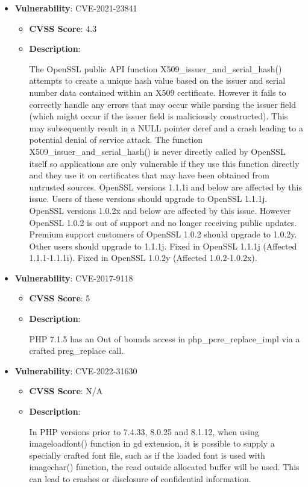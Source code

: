 \documentclass{article}
\begin{document}
\begin{itemize}
        \item \textbf{Vulnerability}: CVE-2021-23841
        \begin{itemize}
            \item \textbf{CVSS Score}:  4.3 
            \item \textbf{Description}:
            \parbox[t]{0.9\linewidth}{
                \ttfamily The OpenSSL public API function X509\_issuer\_and\_serial\_hash() attempts to create a unique hash value based on the issuer and serial number data contained within an X509 certificate. However it fails to correctly handle any errors that may occur while parsing the issuer field (which might occur if the issuer field is maliciously constructed). This may subsequently result in a NULL pointer deref and a crash leading to a potential denial of service attack. The function X509\_issuer\_and\_serial\_hash() is never directly called by OpenSSL itself so applications are only vulnerable if they use this function directly and they use it on certificates that may have been obtained from untrusted sources. OpenSSL versions 1.1.1i and below are affected by this issue. Users of these versions should upgrade to OpenSSL 1.1.1j. OpenSSL versions 1.0.2x and below are affected by this issue. However OpenSSL 1.0.2 is out of support and no longer receiving public updates. Premium support customers of OpenSSL 1.0.2 should upgrade to 1.0.2y. Other users should upgrade to 1.1.1j. Fixed in OpenSSL 1.1.1j (Affected 1.1.1-1.1.1i). Fixed in OpenSSL 1.0.2y (Affected 1.0.2-1.0.2x).
            }
        \end{itemize}
    
        \item \textbf{Vulnerability}: CVE-2017-9118
        \begin{itemize}
            \item \textbf{CVSS Score}:  5 
            \item \textbf{Description}:
            \parbox[t]{0.9\linewidth}{
                \ttfamily PHP 7.1.5 has an Out of bounds access in php\_pcre\_replace\_impl via a crafted preg\_replace call.
            }
        \end{itemize}
    
        \item \textbf{Vulnerability}: CVE-2022-31630
        \begin{itemize}
            \item \textbf{CVSS Score}:  N/A 
            \item \textbf{Description}:
            \parbox[t]{0.9\linewidth}{
                \ttfamily In PHP versions prior to 7.4.33, 8.0.25 and 8.1.12, when using imageloadfont() function in gd extension, it is possible to supply a specially crafted font file, such as if the loaded font is used with imagechar() function, the read outside allocated buffer will be used. This can lead to crashes or disclosure of confidential information.
            }
        \end{itemize}
    

\end{itemize}
\end{document}
